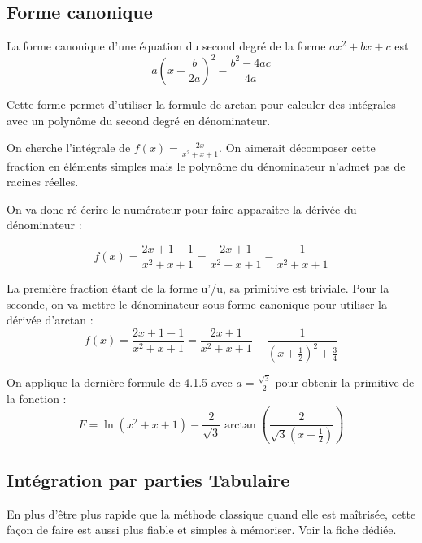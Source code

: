 \documentclass[french]{yLectureNote}
\begin{document}
\subsection{Forme canonique}
\begin{theorem}
 La forme canonique d'une équation du second degré de la forme \(ax^2+bx+c\) est \[a(x+\frac{b}{2a})^2 - \frac{b^2-4ac}{4a}\]
\end{theorem}
Cette forme permet d'utiliser la formule de arctan pour calculer des intégrales avec un polyn\^ome du second degré en dénominateur.

On cherche l'intégrale de \(f(x) = \frac{2x}{x^2+x+1}\). On aimerait décomposer cette fraction en éléments simples mais le polyn\^ome du dénominateur n'admet pas de racines réelles.

On va donc ré-écrire le numérateur pour faire apparaitre la dérivée du dénominateur :

\[f(x) = \frac{2x+1-1}{x^2+x+1} = \frac{2x+1}{x^2+x+1}-\frac{1}{x^2+x+1}\]

La première fraction étant de la forme u'/u, sa primitive est triviale. Pour la seconde, on va mettre le dénominateur sous forme canonique pour utiliser la dérivée d'arctan :
\[f(x) = \frac{2x+1-1}{x^2+x+1} = \frac{2x+1}{x^2+x+1}-\frac{1}{(x+\frac{1}{2})^2+\frac{3}{4}}\]

On applique la dernière formule de 4.1.5 avec \(a = \frac{\sqrt{3}}{2}\) pour obtenir la primitive de la fonction :
\[F = \ln(x^2+x+1) - \frac{2}{\sqrt{3}}\arctan(\frac{2}{\sqrt{3}(x+\frac{1}{2})})\]
\subsection{Intégration par parties Tabulaire}
En plus d'\^etre plus rapide que la méthode classique quand elle est ma\^itrisée, cette façon de faire est aussi plus fiable et simples à mémoriser. Voir la fiche dédiée.
 
\end{document}
